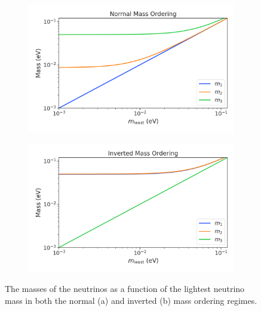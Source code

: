 \begin{figure}[htbp]
    \centering
    \begin{subfigure}{0.49\textwidth}
        \includegraphics*[width=\textwidth]{figs/Chapter-2/230302_mass_estate_vals_normal.png}
        \caption{}
    \end{subfigure}
    \hfill
    \begin{subfigure}{0.49\textwidth}
        \includegraphics*[width=\textwidth]{figs/Chapter-2/230302_mass_estate_vals_inverted.png}
        \caption{}
    \end{subfigure}
    \caption{The masses of the neutrinos as a function of the lightest neutrino mass in both the normal (a) and inverted (b) mass ordering regimes.}
    \label{fig:chap2-mass-estates}
\end{figure}


